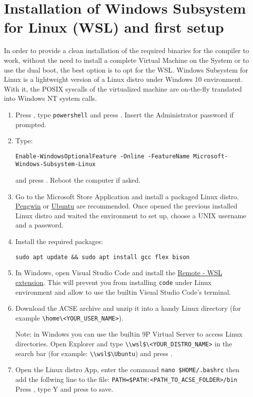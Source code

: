 \documentclass{article}
\begin{document}
\section{Installation of Windows Subsystem for Linux (WSL) and first setup}
In order to provide a clean installation of the required binaries for the compiler to work, without the need to install 
a complete Virtual Machine on the System or to use the dual boot, the best option is to opt for
the WSL. Windows Subsystem for Linux is a lightweight version of a Linux distro under Windows 10 environment.
With it, the POSIX syscalls of the virtualized machine are on-the-fly translated into Windows NT system calls.
\begin{enumerate}
    \item Press , type \verb'powershell' and press \keys{\ctrl + \shift + \enter}. Insert the Administrator password if prompted.
    \item Type: 
    \begin{scriptsize}{\begin{verbatim}Enable-WindowsOptionalFeature -Online -FeatureName Microsoft-Windows-Subsystem-Linux\end{verbatim}}\end{scriptsize}
    and press \keys{\enter}. Reboot the computer if asked.
    \item Go to the Microsoft Store Application and install a packaged Linux distro. \href{https://www.microsoft.com/it-it/p/pengwin/9nv1gv1pxz6p}{Pengwin} or \href{https://www.microsoft.com/it-it/p/ubuntu/9nblggh4msv6}{Ubuntu} are recommended.
    Once opened the previous installed Linux distro and waited the environment to set up, choose a UNIX username and a password.
    \item Install the required packages: 
    \begin{verbatim}sudo apt update && sudo apt install gcc flex bison\end{verbatim}
    \item In Windows, open Visual Studio Code and install the \href{https://marketplace.visualstudio.com/items?itemName=ms-vscode-remote.remote-wsl}{Remote - WSL extension}. This will prevent you from installing \verb+code+ under Linux environment and allow to use the builtin Visual Studio Code's terminal.
    \item Download the ACSE archive and unzip it into a handy Linux directory (for example \verb+\home\<YOUR_USER_NAME>+). \newline \newline \begin{small} Note: in Windows you can use the builtin 9P Virtual Server to access Linux directories. Open Explorer and type \verb+\\wsl$\<YOUR_DISTRO_NAME>+ in the search bar (for example: \verb+\\wsl$\Ubuntu+) and press \keys{\enter}.\end{small}
    \item Open the Linux distro App, enter the command \verb+nano $HOME/.bashrc+ then add the follwing line to the file:
    \verb+PATH=$PATH:<PATH_TO_ACSE_FOLDER>/bin+ Press , type Y and press  to save.
  \end{enumerate}
\end{document}
